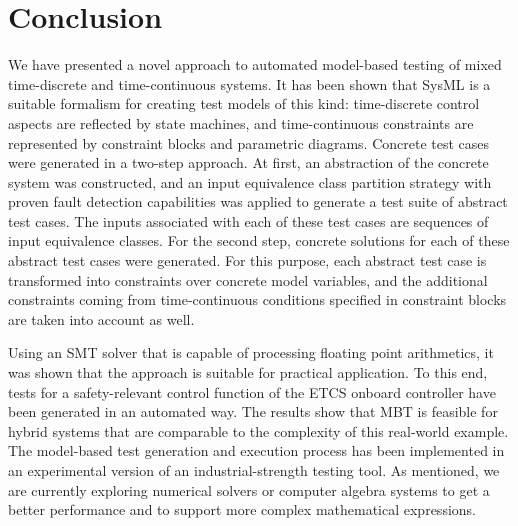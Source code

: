 \section{Conclusion}

We have presented a novel approach to automated model-based testing of mixed 
time-discrete and time-continuous systems. It has been shown that SysML is a suitable 
formalism for creating test models of this kind: time-discrete control aspects 
are reflected by state machines, and time-continuous constraints are 
represented by constraint blocks and parametric diagrams. Concrete test cases were generated
in a two-step approach. At first, an abstraction  of the concrete system
was constructed, and an input equivalence class partition strategy with proven fault detection capabilities was applied to generate a test suite of abstract test cases.
The inputs associated with each of these test cases are sequences of input equivalence classes. For the second step, concrete solutions for each of these abstract test cases were generated. For this purpose, each abstract test case is transformed 
into constraints over concrete model variables, and the additional constraints coming
from time-continuous conditions specified in constraint blocks are taken into account as well. 

Using an SMT solver that is capable of processing floating point arithmetics, it was shown that the approach is suitable for practical application. 
To this end, tests for 
a safety-relevant 
control function of the ETCS onboard controller have been generated in an automated way.  
The results show that MBT is feasible for hybrid systems
that are comparable to the complexity of this real-world example. 
The model-based test generation and execution process has been implemented in an experimental version of  an industrial-strength testing tool. As mentioned, we are currently exploring numerical solvers or computer algebra systems to get a better performance and to support more complex mathematical expressions. 

